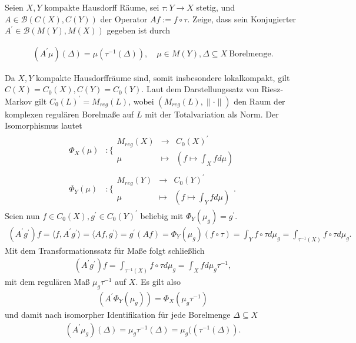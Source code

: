 \begin{exercise}

Seien $X, Y$ kompakte Hausdorff Räume, sei $\tau: Y \to X$ stetig, und $A \in \mathcal{B}(C(X), C(Y))$ der Operator $A f := f \circ \tau$.
Zeige, dass sein Konjugierter $A^\prime \in \mathcal{B}(M(Y), M(X))$ gegeben ist durch

\begin{align*}
  (A^\prime \mu)(\Delta) = \mu(\tau^{-1}(\Delta)),
  \quad
  \mu \in M(Y), \Delta \subseteq X ~\text{Borelmenge}.
\end{align*}

\end{exercise}

\begin{solution}
Da $X,Y$ kompakte Hausdorffräume sind, somit insbesondere lokalkompakt, gilt $C(X) = C_0(X), C(Y) = C_0(Y)$.
Laut dem Darstellungssatz von Riesz-Markov gilt $C_0(L)^{\prime} = M_{reg}(L)$,
wobei $(M_{reg}(L), \|\cdot\|)$ den Raum der komplexen regulären Borelmaße auf $L$
mit der Totalvariation als Norm.
Der Isomorphismus lautet
\begin{align*}
  \Phi_X(\mu)&: \Bigg\{ \begin{matrix}
    M_{reg}(X) & \to & C_0(X)^{\prime} \\
    \mu & \mapsto & (f \mapsto \int_X f d\mu)
  \end{matrix} \\
  \Phi_Y(\mu)&: \Bigg\{ \begin{matrix}
    M_{reg}(Y) & \to & C_0(Y)^{\prime} \\
    \mu & \mapsto & (f \mapsto \int_Y f d\mu)
  \end{matrix}.
\end{align*}
Seien nun $f \in C_0(X), g^{\prime} \in C_0(Y)^{\prime}$ beliebig mit $\Phi_Y(\mu_g) = g^{\prime}$.
\begin{align*}
  (A^{\prime}g^{\prime})f = \langle f, A^{\prime}g^{\prime} \rangle = \langle A f, g^{\prime} \rangle
  = g^{\prime}(Af) = \Phi_Y(\mu_g)(f \circ \tau)
  = \int_Y f\circ \tau d\mu_g
  = \int_{\tau^{-1}(X)} f \circ \tau d\mu_g.
\end{align*}
Mit dem Transformationssatz für Maße folgt schließlich
\begin{align*}
  (A^{\prime}g^{\prime})f = \int_{\tau^{-1}(X)} f \circ \tau d\mu_g
  = \int_{X} f d\mu_g\tau^{-1},
\end{align*}
mit dem regulären Maß $\mu_g\tau^{-1}$ auf $X$.
Es gilt also
\begin{align*}
  (A^{\prime}\Phi_Y(\mu_g)) = \Phi_X(\mu_g\tau^{-1})
\end{align*}
und damit nach isomorpher Identifikation für jede Borelmenge $\Delta \subseteq X$
\begin{align*}
  (A^{\prime}\mu_g)(\Delta) = \mu_g\tau^{-1}(\Delta) = \mu_g((\tau^{-1}(\Delta)).
\end{align*}
\end{solution}
